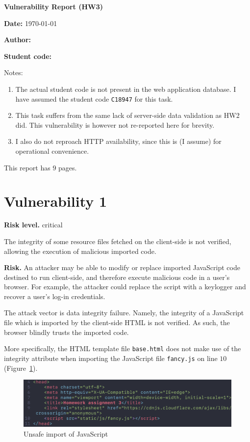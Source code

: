 \documentclass[parskip=half]{scrartcl}
\newcommand{\figref}[1]{Figure~\ref{#1}}
\begin{document}
{\LARGE \textbf{\textsf{Vulnerability Report (HW3)}}}
\vspace*{1em}

\textbf{Date:} \today

\textbf{Author:} \docauthor

\textbf{Student code:} \texttt{\studentcode}

Notes:
\begin{enumerate}
    \item The actual student code is not present in the web application
    database. I have assumed the student code \texttt{C18947} for this task.

    \item This task suffers from the same lack of server-side data validation
    as HW2 did. This vulnerability is however not re-reported here for brevity.
    
    \item I also do not reproach HTTP availability, since this is (I assume)
    for operational convenience.
\end{enumerate}

This report has $9$ pages.

\section*{Vulnerability 1}\label{vuln1}

\textbf{Risk level.} critical

The integrity of some resource files fetched on the client-side is not
verified, allowing the execution of malicious imported code.

\textbf{Risk.} An attacker may be able to modify or replace imported JavaScript
code destined to run client-side, and therefore execute malicious code in a
user's browser. For example, the attacker could replace the script with a 
keylogger and recover a user's log-in credentials.

The attack vector is data integrity failure. Namely, the integrity of a
JavaScript file which is imported by the client-side HTML is not verified. As
such, the browser blindly trusts the imported code.

More specifically, the HTML template file \texttt{base.html} does not make
use of the integrity attribute when importing the JavaScript file
\texttt{fancy.js} on line $10$ (\figref{fig:code:lackverif}).

\begin{figure}[h]
    \centering
    \includegraphics[width=\textwidth]{lackverif}
    \caption{Unsafe import of JavaScript}
    \label{fig:code:lackverif}
\end{figure}
\end{document}
